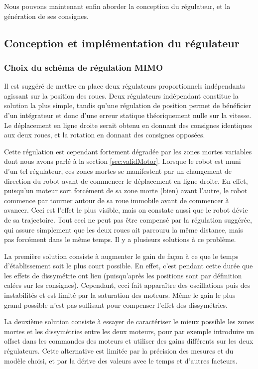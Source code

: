Nous pouvons maintenant enfin aborder la conception du régulateur, et la génération de ses consignes.

\subsection{Conception et implémentation du régulateur}
\subsubsection{Choix du schéma de régulation MIMO}
Il est suggéré de mettre en place deux régulateurs proportionnels indépendants agissant sur la position des roues. Deux régulateurs indépendant constitue la solution la plus simple, tandis qu'une régulation de position permet de bénéficier d'un intégrateur et donc d'une erreur statique théoriquement nulle sur la vitesse. Le déplacement en ligne droite serait obtenu en donnant des consignes identiques aux deux roues, et la rotation en donnant des consignes opposées.

Cette régulation est cependant fortement dégradée par les zones mortes variables dont nous avons parlé à la section \ref{sec:validMotor}. Lorsque le robot est muni d'un tel régulateur, ces zones mortes se manifestent par un changement de direction du robot avant de commencer le déplacement en ligne droite. En effet, puisqu'un moteur sort forcément de sa zone morte (bien) avant l'autre, le robot commence par tourner autour de sa roue immobile avant de commencer à avancer. Ceci est l'effet le plus visible, mais on constate aussi que le robot dévie de sa trajectoire. Tout ceci ne peut pas être compensé par la régulation suggérée, qui assure simplement que les deux roues ait parcouru la même distance, mais pas forcément dans le même temps. Il y a plusieurs solutions à ce problème.

La première solution consiste à augmenter le gain de façon à ce que le temps d'établissement soit le plus court possible. En effet, c'est pendant cette durée que les effets de dissymétrie ont lieu (puisqu'après les positions sont par définition calées sur les consignes). Cependant, ceci fait apparaître des oscillations puis des instabilités et est limité par la saturation des moteurs. Même le gain le plus grand possible n'est pas suffisant pour compenser l'effet des dissymétries.

La deuxième solution consiste à essayer de caractériser le mieux possible les zones mortes et les dissymétries entre les deux moteurs, pour par exemple introduire un offset dans les commandes des moteurs et utiliser des gains différents sur les deux régulateurs. Cette alternative est limitée par la précision des mesures et du modèle choisi, et par la dérive des valeurs avec le temps et d'autres facteurs.

